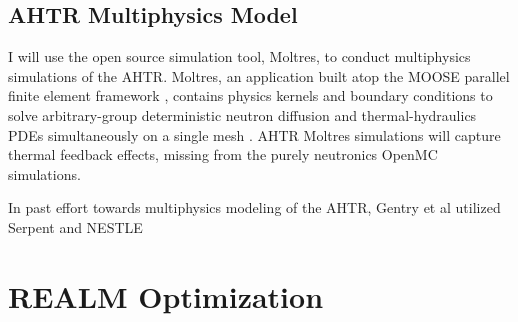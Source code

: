 \subsection{\gls{AHTR} Multiphysics Model}
I will use the open source simulation tool, Moltres, to conduct multiphysics 
simulations of the \gls{AHTR}. 
Moltres, an application built atop the \gls{MOOSE} parallel finite element 
framework \cite{gaston_moose:_2009}, contains physics kernels and boundary 
conditions to solve arbitrary-group deterministic neutron diffusion and 
thermal-hydraulics \glspl{PDE} simultaneously on a single mesh
\cite{lindsay_introduction_2018,park_advancement_2020}. 
\gls{AHTR} Moltres simulations will capture thermal feedback effects, missing 
from the purely neutronics OpenMC simulations.  

In past effort towards multiphysics modeling of the \gls{AHTR}, Gentry et al 
\cite{gentry_development_2016} utilized Serpent \cite{leppanen_serpent_2014} 
and NESTLE


\section{REALM Optimization}


